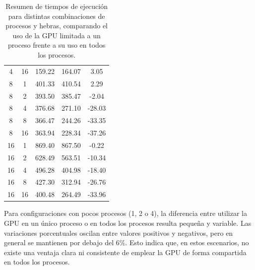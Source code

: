\begin{table}[ht]
\begin{tabular}{|c|c|c|c|c|}
        4                 & 16              & 159.22                     & 164.07                 & 3.05               \\
        8                 & 1               & 401.33                     & 410.54                 & 2.29               \\
        8                 & 2               & 393.50                     & 385.47                 & -2.04              \\
        8                 & 4               & 376.68                     & 271.10                 & -28.03             \\
        8                 & 8               & 366.47                     & 244.26                 & -33.35             \\
        8                 & 16              & 363.94                     & 228.34                 & -37.26             \\
        16                & 1               & 869.40                     & 867.50                 & -0.22              \\
        16                & 2               & 628.49                     & 563.51                 & -10.34             \\
        16                & 4               & 496.28                     & 404.98                 & -18.40             \\
        16                & 8               & 427.30                     & 312.94                 & -26.76             \\
        16                & 16              & 400.48                     & 264.49                 & -33.96             \\
        \hline
    \end{tabular}
    \caption{Resumen de tiempos de ejecución para distintas combinaciones de procesos y hebras, comparando el uso de la GPU limitada a un proceso frente a su uso en todos los procesos.}
    \label{tab:summary_nodes_threads_gpu}
\end{table}

Para configuraciones con pocos procesos (1, 2 o 4), la diferencia entre utilizar la GPU en un único proceso o en todos los procesos resulta pequeña y variable. Las variaciones porcentuales oscilan entre valores positivos y negativos, pero en general se mantienen por debajo del 6\%. Esto indica que, en estos escenarios, no existe una ventaja clara ni consistente de emplear la GPU de forma compartida en todos los procesos.

